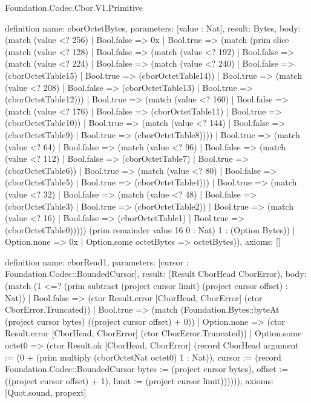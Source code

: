 \begin{lexlean}{Foundation.Codec.Cbor.V1.Primitive}
\begin{semanticmodule}
definition{
  name: cborOctetBytes,
  parameters: [value : Nat],
  result: Bytes,
  body: (match (value <? 256)
    | Bool.false => 0x
    | Bool.true => (match (prim slice (match (value <? 128)
        | Bool.false => (match (value <? 192)
          | Bool.false => (match (value <? 224)
            | Bool.false => (match (value <? 240)
              | Bool.false => (cborOctetTable15)
              | Bool.true => (cborOctetTable14))
            | Bool.true => (match (value <? 208)
              | Bool.false => (cborOctetTable13)
              | Bool.true => (cborOctetTable12)))
          | Bool.true => (match (value <? 160)
            | Bool.false => (match (value <? 176)
              | Bool.false => (cborOctetTable11)
              | Bool.true => (cborOctetTable10))
            | Bool.true => (match (value <? 144)
              | Bool.false => (cborOctetTable9)
              | Bool.true => (cborOctetTable8))))
        | Bool.true => (match (value <? 64)
          | Bool.false => (match (value <? 96)
            | Bool.false => (match (value <? 112)
              | Bool.false => (cborOctetTable7)
              | Bool.true => (cborOctetTable6))
            | Bool.true => (match (value <? 80)
              | Bool.false => (cborOctetTable5)
              | Bool.true => (cborOctetTable4)))
          | Bool.true => (match (value <? 32)
            | Bool.false => (match (value <? 48)
              | Bool.false => (cborOctetTable3)
              | Bool.true => (cborOctetTable2))
            | Bool.true => (match (value <? 16)
              | Bool.false => (cborOctetTable1)
              | Bool.true => (cborOctetTable0))))) (prim remainder value 16 0 : Nat) 1 : (Option Bytes))
      | Option.none => 0x
      | Option.some octetBytes => octetBytes)),
  axioms: []
}

definition{
  name: cborRead1,
  parameters: [cursor : Foundation.Codec::BoundedCursor],
  result: (Result CborHead CborError),
  body: (match (1 <=? (prim subtract (project cursor limit) (project cursor offset) : Nat))
    | Bool.false => (ctor Result.error [CborHead, CborError] (ctor CborError.Truncated))
    | Bool.true => (match (Foundation.Bytes::byteAt (project cursor bytes) ((project cursor offset) + 0))
      | Option.none => (ctor Result.error [CborHead, CborError] (ctor CborError.Truncated))
      | Option.some octet0 => (ctor Result.ok [CborHead, CborError] (record CborHead {argument := (0 + (prim multiply (cborOctetNat octet0) 1 : Nat)), cursor := (record Foundation.Codec::BoundedCursor {bytes := (project cursor bytes), offset := ((project cursor offset) + 1), limit := (project cursor limit)})})))),
  axioms: [Quot.sound, propext]
}


\end{semanticmodule}
\end{lexlean}

